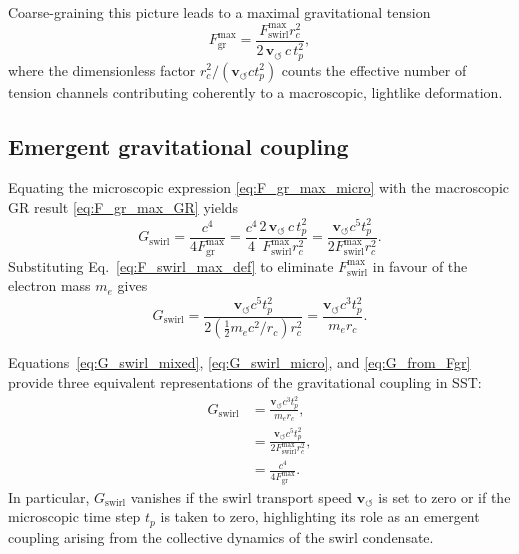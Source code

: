 \documentclass[10pt,reprint,aps,onecolumn,nofootinbib]{revtex4-2}
\newcommand{\vswirl}{\mathbf{v}_{\!\boldsymbol{\circlearrowleft}}}
\newcommand{\rc}{r_c}                                    %
\begin{document}
            Coarse-graining this picture leads to a maximal gravitational tension
            \begin{equation}
                F_{\text{gr}}^{\max}
                = \frac{F_{\text{swirl}}^{\max} \rc^2}
                {2\,\vswirl\,c\,t_p^2},
                \label{eq:F_gr_max_micro}
            \end{equation}
            where the dimensionless factor
            \(\rc^2/(\vswirl c t_p^2)\) counts the effective number of tension channels
            contributing coherently to a macroscopic, lightlike deformation.

        \subsection{Emergent gravitational coupling}

            Equating the microscopic expression \eqref{eq:F_gr_max_micro} with the
            macroscopic GR result \eqref{eq:F_gr_max_GR} yields
            \begin{equation}
                G_{\text{swirl}}
                = \frac{c^4}{4 F_{\text{gr}}^{\max}}
                = \frac{c^4}{4}
                \frac{2\,\vswirl\,c\,t_p^2}
                {F_{\text{swirl}}^{\max} \rc^2}
                = \frac{\vswirl c^5 t_p^2}
                {2 F_{\text{swirl}}^{\max} \rc^2}.
                \label{eq:G_swirl_mixed}
            \end{equation}
            Substituting Eq.~\eqref{eq:F_swirl_max_def} to eliminate
            \(F_{\text{swirl}}^{\max}\) in favour of the electron mass \(m_e\) gives
            \begin{equation}
                G_{\text{swirl}}
                = \frac{\vswirl c^5 t_p^2}
                {2 (\tfrac{1}{2} m_e c^2 / \rc) \rc^2}
                = \frac{\vswirl c^3 t_p^2}{m_e \rc}.
                \label{eq:G_swirl_micro}
            \end{equation}

            Equations~\eqref{eq:G_swirl_mixed}, \eqref{eq:G_swirl_micro}, and
            \eqref{eq:G_from_Fgr} provide three equivalent representations of the
            gravitational coupling in SST:
            \begin{align}
                G_{\text{swirl}}
                &= \frac{\vswirl c^3 t_p^2}{m_e \rc},
                \label{eq:G_swirl_form1}
                \\
                &= \frac{\vswirl c^5 t_p^2}
                {2 F_{\text{swirl}}^{\max} \rc^2},
                \label{eq:G_swirl_form2}
                \\
                &= \frac{c^4}{4 F_{\text{gr}}^{\max}}.
                \label{eq:G_swirl_form3}
            \end{align}
            In particular, \(G_{\text{swirl}}\) vanishes if the swirl transport speed
            \(\vswirl\) is set to zero or if the microscopic time step \(t_p\) is taken
            to zero, highlighting its role as an emergent coupling arising from the
            collective dynamics of the swirl condensate.
\end{document}

